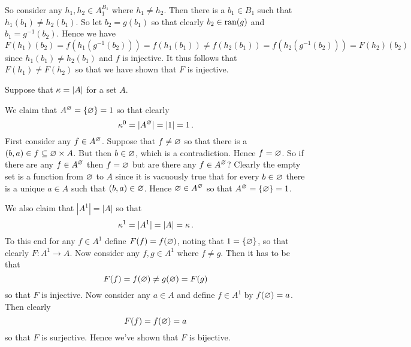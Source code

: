 \begin{solution}
    So consider any $h_1, h_2 \in A_1^{B_1}$ where $h_1 \neq h_2$.
    Then there is a $b_1 \in B_1$ such that $h_1(b_1) \neq h_2(b_1)$.
    So let $b_2 = g(b_1)$ so that clearly $b_2 \in \mathrm{ran}(g)$ and $b_1 = g^{-1}(b_2)$.
    Hence we have
    $$
    F(h_1)(b_2) = f(h_1(g^{-1}(b_2))) = f(h_1(b_1)) \neq f(h_2(b_1)) = f(h_2(g^{-1}(b_2))) = F(h_2)(b_2)
    $$
    since $h_1(b_1) \neq h_2(b_1)$ and $f$ is injective.
    It thus follows that $F(h_1) \neq F(h_2)$ so that we have shown that $F$ is injective. \qedsymbol
\end{solution}


\begin{solution}
    Suppose that $\kappa = |A|$ for a set $A$.

    We claim that $A^\varnothing = \left\{ \varnothing \right\} = 1$ so that clearly
    $$
    \kappa^0 = |A^\varnothing| = |1| = 1 \,.
    $$
    First consider any $f \in A^\varnothing$.
    Suppose that $f \neq \varnothing$ so that there is a $(b,a) \in f \subseteq \varnothing \times A$.
    But then $b \in \varnothing$, which is a contradiction.
    Hence $f = \varnothing$.
    So if there are any $f \in A^\varnothing$ then $f = \varnothing$ but are there any $f \in A^\varnothing$?
    Clearly the empty set is a function from $\varnothing$ to $A$ since it is vacuously true that for every $b \in \varnothing$ there is a unique $a \in A$ such that $(b,a) \in \varnothing$.
    Hence $\varnothing \in A^\varnothing$ so that $A^\varnothing = \left\{ \varnothing \right\} = 1$.

    We also claim that $|A^1| = |A|$ so that
    $$
    \kappa^1 = |A^1| = |A| = \kappa \,.
    $$
    To this end for any $f \in A^1$ define $F(f) = f(\varnothing)$, noting that $1 = \left\{ \varnothing \right\}$, so that clearly $F: A^1 \to A$.
    Now consider any $f,g \in A^1$ where $f \neq g$.
    Then it has to be that
    $$
    F(f) = f(\varnothing) \neq g(\varnothing) = F(g)
    $$
    so that $F$ is injective.
    Now consider any $a \in A$ and define $f \in A^1$ by $f(\varnothing) = a$.
    Then clearly
    $$
    F(f) = f(\varnothing) = a
    $$
    so that $F$ is surjective.
    Hence we've shown that $F$ is bijective. \qedsymbol
\end{solution}


